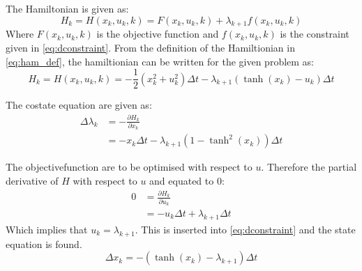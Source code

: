 
The Hamiltonian is given as:
\begin{equation}
  H_k = H\left( x_k, u_k, k \right) = F\left( x_k, u_k, k \right) + \lambda_{k + 1} f\left( x_k, u_k, k \right)
  \label{eq:ham_def}
\end{equation}
Where $F\left( x_k, u_k, k \right)$ is the objective function and $f\left( x_k, u_k, k \right)$ is the constraint given
in \eqref{eq:dconstraint}.
From the definition of the Hamiltionian in \eqref{eq:ham_def}, the hamiltionian can be written for the given problem as:
\begin{equation} 
  H_k = H\left( x_k, u_k, k \right) = - \frac{1}{2}\left( x_k^2 + u_k^2 \right)\Delta t - \lambda_{k + 1}
  \left( \tanh{(x_k) - u_k} \right)\Delta t
\end{equation}

The costate equation are given as:
\begin{equation}
  \begin{split}
    \Delta\lambda_k &= - \frac{\partial H_k}{\partial x_k} \\
    &= - x_k \Delta t - \lambda_{k + 1} \left( 1 - \tanh^2{(x_k)} \right)\Delta t
  \end{split}
\end{equation}

The objectivefunction are to be optimised with respect to $u$. Therefore the partial derivative of $H$ with respect to
$u$ and equated to $0$:
\begin{equation}
  \begin{split}
    0 &= \frac{\partial H_k}{\partial u_k} \\
    &= - u_k\Delta t + \lambda_{k + 1} \Delta t
  \end{split}
\end{equation}
Which implies that $u_k = \lambda_{k + 1}$. This is inserted into \eqref{eq:dconstraint} and the state equation is
found.
\begin{equation}
  \Delta x_k = -\left( \tanh{(x_k)} - \lambda_{k + 1} \right)\Delta t
\end{equation}


